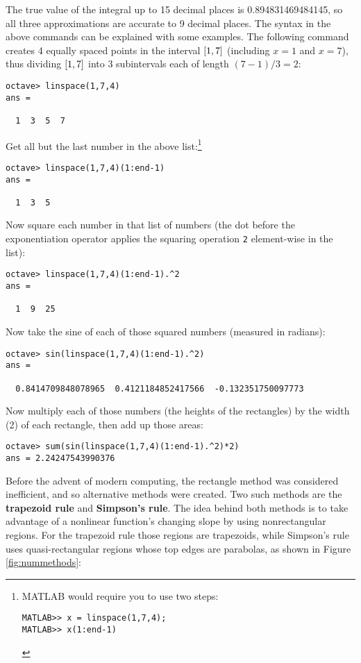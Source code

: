 The true value of the integral up to 15 decimal places is 0.894831469484145, so
all three approximations are accurate to 9 decimal places.
\newpage
The syntax in the above commands can be explained with some examples. The
following command creates 4 equally spaced points in the interval $\lbrack 1,7 \rbrack$
(including $x=1$ and $x=7$), thus dividing $\lbrack 1,7 \rbrack$ into 3 subintervals
each of length $(7-1)/3 = 2$:
\begin{Verbatim}[frame=single, framesep=2mm]
octave> linspace(1,7,4)
ans =

  1  3  5  7
\end{Verbatim}
Get all but the last number in the above list:\footnote{MATLAB would require you to
use two steps:
\begin{Verbatim}[frame=single]
MATLAB>> x = linspace(1,7,4);
MATLAB>> x(1:end-1)
\end{Verbatim}
}
\begin{Verbatim}[frame=single, framesep=2mm]
octave> linspace(1,7,4)(1:end-1)
ans =

  1  3  5
\end{Verbatim}
Now square each number in that list of numbers (the dot before the
exponentiation operator \texttt{} applies the squaring operation
\texttt{2} element-wise in the list):
\begin{Verbatim}[frame=single, framesep=2mm]
octave> linspace(1,7,4)(1:end-1).^2
ans =

  1  9  25
\end{Verbatim}
Now take the sine of each of those squared numbers (measured in radians):
\begin{Verbatim}[frame=single, framesep=2mm]
octave> sin(linspace(1,7,4)(1:end-1).^2)
ans =

  0.8414709848078965  0.4121184852417566  -0.132351750097773
\end{Verbatim}
Now multiply each of those numbers (the heights of the rectangles) by the
width (2) of each rectangle, then add up those areas:
\begin{Verbatim}[frame=single, framesep=2mm]
octave> sum(sin(linspace(1,7,4)(1:end-1).^2)*2)
ans = 2.24247543990376
\end{Verbatim}
\newpage
Before the advent of modern computing, the rectangle method was considered
inefficient, and so alternative methods were created. Two such methods are the
\textbf{trapezoid rule} and \textbf{Simpson's rule}. The idea behind both
methods is to take advantage of a nonlinear function's changing slope by using
nonrectangular regions. For the trapezoid rule those regions are trapezoids,
while Simpson's rule uses quasi-rectangular regions whose top edges are
parabolas, as shown in Figure \ref{fig:nummethods}:

